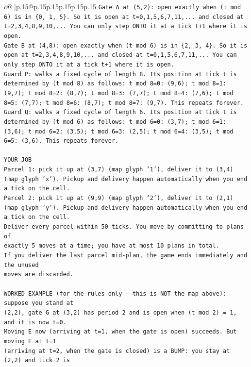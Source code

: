 \documentclass{article}
\begin{document}
{\begin{supertabular}{c@{$\;$}|p{.15\linewidth}@{}p{.15\linewidth}p{.15\linewidth}p{.15\linewidth}p{.15\linewidth}p{.15\linewidth}}
{{{\texttt{Gate A at (5,2): open exactly when (t mod 6) is in \{0, 1, 5\}. So it is open at t=0,1,5,6,7,11,... and closed at t=2,3,4,8,9,10,... You can only step ONTO it at a tick t+1 where it is open.} \\
\texttt{Gate B at (4,8): open exactly when (t mod 6) is in \{2, 3, 4\}. So it is open at t=2,3,4,8,9,10,... and closed at t=0,1,5,6,7,11,... You can only step ONTO it at a tick t+1 where it is open.} \\
\texttt{Guard P: walks a fixed cycle of length 8. Its position at tick t is determined by (t mod 8) as follows: t mod 8=0: (9,6); t mod 8=1: (9,7); t mod 8=2: (8,7); t mod 8=3: (7,7); t mod 8=4: (7,6); t mod 8=5: (7,7); t mod 8=6: (8,7); t mod 8=7: (9,7). This repeats forever.} \\
\texttt{Guard Q: walks a fixed cycle of length 6. Its position at tick t is determined by (t mod 6) as follows: t mod 6=0: (3,7); t mod 6=1: (3,6); t mod 6=2: (3,5); t mod 6=3: (2,5); t mod 6=4: (3,5); t mod 6=5: (3,6). This repeats forever.} \\
\\ 
\texttt{YOUR JOB} \\
\texttt{Parcel 1: pick it up at (3,7) (map glyph '1'), deliver it to (3,4) (map glyph 'x'). Pickup and delivery happen automatically when you end a tick on the cell.} \\
\texttt{Parcel 2: pick it up at (9,9) (map glyph '2'), deliver it to (2,1) (map glyph 'y'). Pickup and delivery happen automatically when you end a tick on the cell.} \\
\texttt{Deliver every parcel within 50 ticks. You move by committing to plans of} \\
\texttt{exactly 5 moves at a time; you have at most 10 plans in total.} \\
\texttt{If you deliver the last parcel mid{-}plan, the game ends immediately and the unused} \\
\texttt{moves are discarded.} \\
\\ 
\texttt{WORKED EXAMPLE (for the rules only {-} this is NOT the map above): suppose you stand at} \\
\texttt{(2,2), gate G at (3,2) has period 2 and is open when (t mod 2) = 1, and it is now t=0.} \\
\texttt{Moving E now (arriving at t=1, when the gate is open) succeeds. But moving E at t=1} \\
\texttt{(arriving at t=2, when the gate is closed) is a BUMP: you stay at (2,2) and tick 2 is} \\
}}}
\end{supertabular}}
\end{document}
